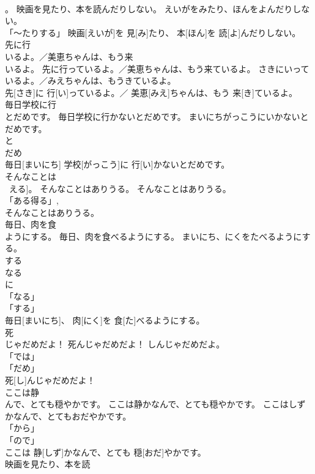 \documentclass[8pt]{extreport}
\begin{document}
\begin{CJK}{UTF8}{min}
\\	。	映画を見たり、本を読んだりしない。	えいがをみたり、ほんをよんだりしない。	
\\	「～たりする」	映画[えいが]を 見[み]たり、 本[ほん]を 読[よ]んだりしない。		
\\	先に行
\\	いるよ。／美恵ちゃんは、もう来
\\	いるよ。	先に行っているよ。／美恵ちゃんは、もう来ているよ。	さきにいっているよ。／みえちゃんは、もうきているよ。	
\\	先[さき]に 行[い]っているよ。／ 美恵[みえ]ちゃんは、もう 来[き]ているよ。		
\\	毎日学校に行
\\	とだめです。	毎日学校に行かないとだめです。	まいにちがっこうにいかないとだめです。	
\\	と
\\	だめ
\\	毎日[まいにち] 学校[がっこう]に 行[い]かないとだめです。		
\\	そんなことは
\\	~える]。	そんなことはありうる。	そんなことはありうる。	
\\	「ある得る」, 
\\	そんなことはありうる。		
\\	毎日、肉を食
\\	ようにする。	毎日、肉を食べるようにする。	まいにち、にくをたべるようにする。	
\\	する 
\\	なる 
\\	に 
\\	「なる」 
\\	「する」 
\\	毎日[まいにち]、 肉[にく]を 食[た]べるようにする。		
\\	死
\\	じゃだめだよ！	死んじゃだめだよ！	しんじゃだめだよ。	
\\	「では」
\\	「だめ」
\\	死[し]んじゃだめだよ！		
\\	ここは静
\\	んで、とても穏やかです。	ここは静かなんで、とても穏やかです。	ここはしずかなんで、とてもおだやかです。	
\\	「から」 
\\	「ので」 
\\	ここは 静[しず]かなんで、とても 穏[おだ]やかです。		
\\	映画を見たり、本を読

\end{CJK}
\end{document}
